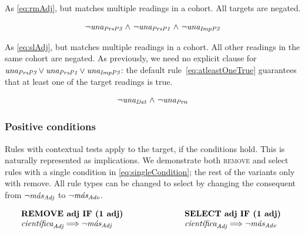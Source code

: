  As \ref{eq:rmAdj}, but matches multiple readings in a cohort. All targets are negated.

\begin{equation}
\begin{array}{c @{~\wedge~} c @{~\wedge~} c}
\neg{} \unaPrsPThree  & \neg \unaPrsPOne & \neg \unaImp
\end{array}
\label{eq:rmVb}
\end{equation}

 As \ref{eq:slAdj}, but matches multiple readings in a cohort. All other readings in the same cohort are negated.
As previously, we need no explicit clause for $\text{\em una}_{\text{\em PrsP3}}  \vee \text{\em una}_{\text{\em PrsP1}} \vee \text{\em una}_{\text{\em ImpP3}}$: the default rule~\ref{eq:atleastOneTrue} guarantees that at least one of the target readings is true.

\begin{equation}
\begin{array}{c @{~\wedge~} c}
\neg \unaDet & \neg \unaPrn \\
\end{array}
\label{eq:slVb}
\end{equation}


\subsubsection{Positive conditions} 

Rules with contextual tests apply to the target, if the conditions hold. 
This is naturally represented as implications. We demonstrate both \textsc{remove} and {\sc select} rules with a single condition in \ref{eq:singleCondition}; the rest of the variants only with {\sc remove}. All rule types can be changed to {\sc select} by changing the consequent from $\neg{}\text{\em m\'{a}s}_{\text{\em Adj}}$ to $\neg{}\text{\em m\'{a}s}_{\text{\em Adv}}$. %


\begin{equation}
\begin{array}{l @{\hspace{2.5cm}} l}
\text{\cgrule{REMOVE adj IF (1 adj)}}   &  \text{\cgrule{SELECT adj IF (1 adj)}} \\
\cientificaAdj \Longrightarrow \neg{}\masAdj &  \cientificaAdj \Longrightarrow  \neg{}\masAdv \\
\end{array}
\label{eq:singleCondition}
\end{equation}

